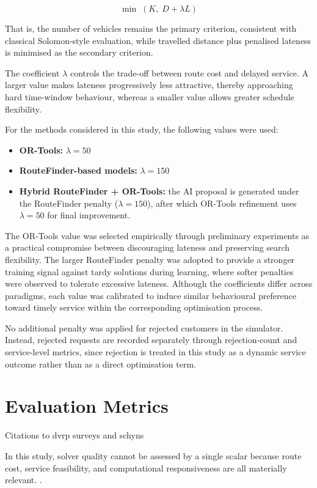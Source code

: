\[
\min \; (K,\; D + \lambda L)
\]

That is, the number of vehicles remains the primary criterion, consistent with
classical Solomon-style evaluation, while travelled distance plus penalised
lateness is minimised as the secondary criterion.

The coefficient $\lambda$ controls the trade-off between route cost and delayed
service. A larger value makes lateness progressively less attractive, thereby
approaching hard time-window behaviour, whereas a smaller value allows greater
schedule flexibility.

For the methods considered in this study, the following values were used:

\begin{itemize}
    \item \textbf{OR-Tools:} $\lambda = 50$
    \item \textbf{RouteFinder-based models:} $\lambda = 150$
    \item \textbf{Hybrid RouteFinder + OR-Tools:} the AI proposal is generated
under the RouteFinder penalty ($\lambda = 150$), after which OR-Tools refinement
uses $\lambda = 50$ for final improvement.
\end{itemize}

The OR-Tools value was selected empirically through preliminary experiments as a
practical compromise between discouraging lateness and preserving search
flexibility. The larger RouteFinder penalty was adopted to provide a stronger
training signal against tardy solutions during learning, where softer penalties
were observed to tolerate excessive lateness. Although the coefficients differ
across paradigms, each value was calibrated to induce similar behavioural
preference toward timely service within the corresponding optimisation process.

No additional penalty was applied for rejected customers in the simulator.
Instead, rejected requests are recorded separately through rejection-count and
service-level metrics, since rejection is treated in this study as a dynamic
service outcome rather than as a direct optimisation term.


\section{Evaluation Metrics}
{\color{red} Citations to dvrp surveys and schyns}

In this study, solver quality cannot be assessed by a single scalar because
route cost, service feasibility, and computational responsiveness are all
materially relevant.
\cite{valueOfInformation, ojedariosRecentDynamicVehicle2021,psaraftisDynamicVehicleRoutingProblems2016}.

